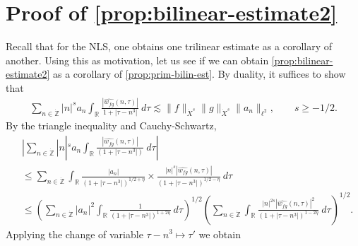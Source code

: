 \documentclass[12pt,reqno]{amsart}
\numberwithin{equation}{section}  %
\numberwithin{figure}{section}
\newcommand{\rr}{\mathbb{R}}
\newcommand{\zz}{\mathbb{Z}}
\newcommand{\zzdot}{\dot{\zz}}
\newcommand{\wh}{\widehat}
\theoremstyle{plain}
\theoremstyle{definition}
\theoremstyle{remark}
\begin{document}
\section{Proof of \autoref{prop:bilinear-estimate2}}
Recall that for the NLS, one obtains one trilinear estimate as a corollary of
another. Using this as motivation, let us see if we can obtain
\autoref{prop:bilinear-estimate2} as a corollary of
\autoref{prop:prim-bilin-est}. By
duality, it suffices to show that
%
\begin{equation}
	\label{duality-est}
	\begin{split}
		\sum_{n \in \zzdot}  |n|^{s}
		a_n \int_{\rr} \frac{|\wh{w_{fg}}(n, \tau)|}{1 
		+ | \tau - n^3 |} \ d \tau \lesssim \|f\|_{\dot{X}^s} \|g\|_{\dot{X}^s}
		\|a_n \|_{\ell^2}, \qquad s \ge -1/2.
	\end{split}
\end{equation}
%
By the triangle inequality 
and Cauchy-Schwartz,
%
\begin{equation}
	\label{1m}
	\begin{split}
		& | \sum_{n \in \zzdot} |n|^{s} a_n
		\int_{\rr}\frac{| \wh{w_{fg}}(n, \tau) |}{(1 + | \tau - n^3 |)} \ d \tau |
		\\
		& \le \sum_{n \in \zzdot} \int_{\rr} \frac{| a_n |}{\left( 1 + 
		| \tau - n^3 |
		\right)^{1/2 + \eta}} \times \frac{| n|^s  |
		\wh{w_{fg}}(n, \tau) |}{\left( 
		1 + | \tau - n^3 | \right)^{1/2 - \eta}} \ d \tau
		\\
		& \le \left( \sum_{n \in \zzdot} | a_{n} |^2\int_{\rr} \frac{1}{\left( 1 + |
		\tau - n^3 | \right)^{1 + 2 \eta}} \ d \tau  
		\right)^{1/2} 
		\left ( \sum_{n \in \zzdot}\int_{\rr} \frac{|n|^{2s} | \wh{w_{fg}}(n, \tau) 
		|^2}{\left( 1 + | \tau - n^3 | \right)^{1 -2 \eta}}\ d \tau 
		\right)^{1/2}.
	\end{split}
\end{equation}
%
Applying the change of variable $\tau - n^3
\mapsto \tau'$ we obtain  
\end{document}
